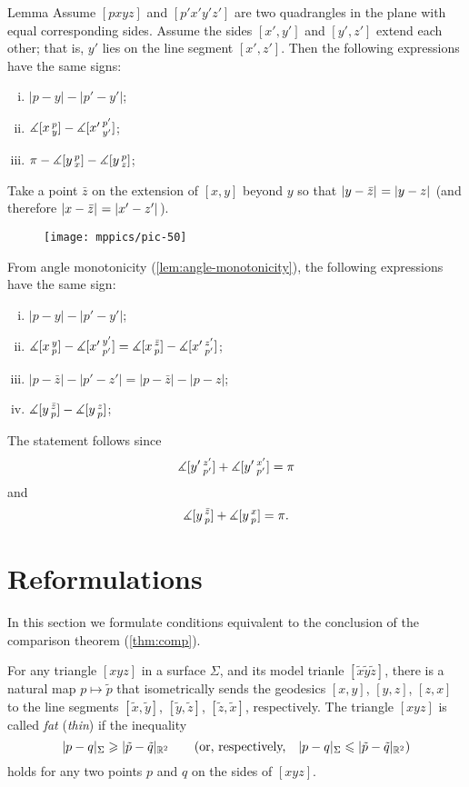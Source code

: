 \begin{thm}{Lemma}
\label{lem:alex}
Assume $[pxyz]$ and $[p'x'y'z']$ are two quadrangles in the plane with equal corresponding sides.
Assume the sides $[x',y']$ and $[y',z']$ extend each other; that is, $y'$ lies on the line segment $[x',z']$.
Then the following expressions have the same signs:
\begin{enumerate}[(i)]
 \item $|p-y|-|p'-y'|$;
 \item $\measuredangle[x\,{}^{p}_{y}]-\measuredangle[x'\,{}^{p'}_{y'}]$;
 \item $\pi-\measuredangle[y\,{}^{p}_{x}]-\measuredangle[y\,{}^{p}_{z}]$;
\end{enumerate}
\end{thm}

Take 
a point $\bar z$ on the extension of 
$[x,y]$ beyond $y$ so that $\dist{y}{\bar z}{}=\dist{y}{z}{}$ (and therefore $\dist{x}{\bar z}{}=\dist{x'}{z'}{}$). 
 
\begin{figure}[!ht]
\vskip-0mm
\centering
\texttt{[image: mppics/pic-50]}
\vskip-0mm
\end{figure}

From angle monotonicity (\ref{lem:angle-monotonicity}), 
the following expressions have the same sign:
\begin{enumerate}[(i)]
\item $|p-y|-|p'-y'|$;
\item $\measuredangle[x\,{}^{y}_{p}]-\measuredangle[x'\,{}^{y'}_{p'}]=\measuredangle[x\,{}^{\bar z}_{p}]-\measuredangle[x'\,{}^{z'}_{p'}]$;
\item $|p-\bar z|-|p'-z'| = | p - \bar z | - | p-z | $;
\item $\measuredangle[y\,{}^{\bar z}_{p}]-\measuredangle[y\,{}^{z}_{p}]$;
\end{enumerate}
The statement follows since
\[\measuredangle[y'\,{}^{z'}_{p'}]+\measuredangle[y'\,{}^{x'}_{p'}]=\pi\]
and
\[\measuredangle[y\,{}^{\bar z}_{p}]+\measuredangle[y\,{}^{x}_{p}]=\pi.\]
\qedsf

\section{Reformulations}

In this section we formulate conditions equivalent to the conclusion of the comparison theorem (\ref{thm:comp}).

For any triangle $[xyz]$ in a surface $\Sigma$, and its model trianle $[\tilde x \tilde y \tilde z]$, there is a natural map $p\mapsto \tilde p$ that isometrically sends the geodesics $[x,y]$, $[y,z]$, $[z,x]$ to the line segments $[\tilde x,\tilde y ]$, $[\tilde y , \tilde z]$, $[ \tilde z , \tilde x ]$, respectively.
The triangle $[xyz]$ is called \emph{fat} (\emph{thin})
if the inequality
\[\dist{p}{q}{\Sigma}\ge |\tilde p- \tilde q|_{\mathbb{R}^2}\qquad \text{(or, respectively,}\quad \dist{p}{q}{\Sigma}\le |\tilde p- \tilde q|_{\mathbb{R}^2})\]
holds for any two points $p$ and $q$ on the sides of $[xyz]$.

